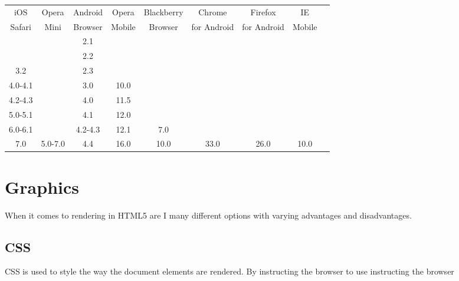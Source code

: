 \documentclass[final]{cmpreport}
\begin{document}
\begin{center}
  \begin{tabular}{|c|c|c|c|c|c|c|c|c|} \hline
  iOS                      & Opera                    & Android                  & Opera  & Blackberry & Chrome      & Firefox     & IE        \\
  Safari                   & Mini                     & Browser                  & Mobile & Browser    & for Android & for Android & Mobile    \\ \hline
  ~                        & ~                        & {\cellcolor{c0}} 2.1     & ~      & ~          & ~           & ~           & ~         \\ \hline
  ~                        & ~                        & {\cellcolor{c0}} 2.2     & ~      & ~          & ~           & ~           & ~         \\ \hline
  {\cellcolor{c0}} 3.2     & ~                        & {\cellcolor{c0}} 2.3     & ~      & ~          & ~           & ~           & ~         \\ \hline
  {\cellcolor{c0}} 4.0-4.1 & ~                        & {\cellcolor{c0}} 3.0     & 10.0   & ~          & ~           & ~           & ~         \\ \hline
  {\cellcolor{c0}} 4.2-4.3 & ~                        & {\cellcolor{c0}} 4.0     & 11.5   & ~          & ~           & ~           & ~         \\ \hline
  {\cellcolor{c0}} 5.0-5.1 & ~                        & {\cellcolor{c0}} 4.1     & 12.0   & ~          & ~           & ~           & ~         \\ \hline
  {\cellcolor{c1}} 6.0-6.1 & ~                        & {\cellcolor{c0}} 4.2-4.3 & 12.1   & 7.0        & ~           & ~           & ~         \\ \hline
  {\cellcolor{c1}} 7.0     & {\cellcolor{c0}} 5.0-7.0 & {\cellcolor{c2}} 4.4     & 16.0   & 10.0       & 33.0        & 26.0        & 10.0      \\ \hline
  \end{tabular}
\end{center}

\section{Graphics}
When it comes to rendering in HTML5 are I many different options with varying advantages and disadvantages.

\subsection{CSS}
CSS is used to style the way the document elements are rendered. By instructing the browser to use  instructing the browser
\end{document}

